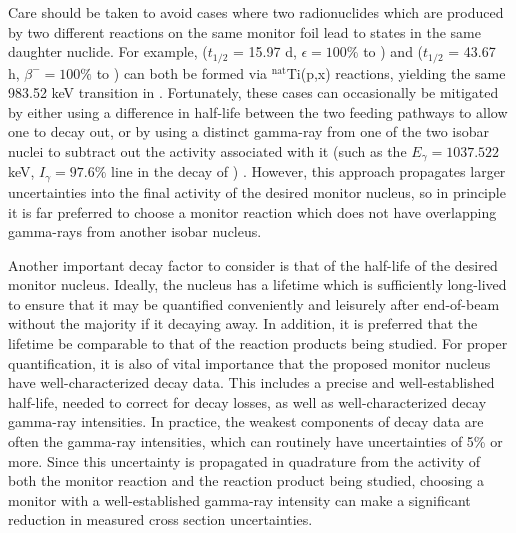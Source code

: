 Care should be taken to avoid cases where two radionuclides which are produced by two different reactions on the same monitor foil lead to states in the same daughter nuclide.  
For example,   ($t_{1/2}$ = 15.97 d, $\epsilon=100\%$ to ) and   ($t_{1/2}$ = 43.67 h, $\beta^-=100\%$ to ) can both be formed via $^\text{nat}$Ti(p,x) reactions, yielding the same 983.52 keV transition in  \cite{Burrows2006}.
Fortunately, these cases can occasionally be mitigated by either using a difference in half-life between the two feeding pathways to allow one to decay out, or by using a distinct gamma-ray from one of the two isobar nuclei to subtract out the activity associated with it (such as the $E_\gamma=1037.522$ keV, $I_\gamma=97.6\%$ line in the decay of ) \cite{Burrows2006}.
However, this approach propagates larger uncertainties into the final activity of the desired monitor nucleus, so in principle it is far preferred to choose a monitor reaction which does not have overlapping gamma-rays from another isobar nucleus.

Another important decay factor to consider is that of the half-life of the desired monitor nucleus.
Ideally, the nucleus has a lifetime which is sufficiently long-lived to ensure that it may be quantified  conveniently and leisurely after end-of-beam without the majority if it decaying away.
In addition, it is preferred that the lifetime be comparable to that of the reaction products being studied. 
For proper quantification, it is also of vital importance that the proposed monitor nucleus have well-characterized decay data.
This includes a precise and well-established half-life,  needed to  correct for decay losses, as well as well-characterized decay gamma-ray intensities.
In practice, the weakest components of decay data are often the gamma-ray intensities, which can routinely have uncertainties of 5\% or more.
Since this uncertainty is propagated in quadrature from the activity of both the monitor reaction and the reaction product being studied, choosing a monitor with a well-established gamma-ray intensity can make a significant reduction in measured cross section uncertainties.


